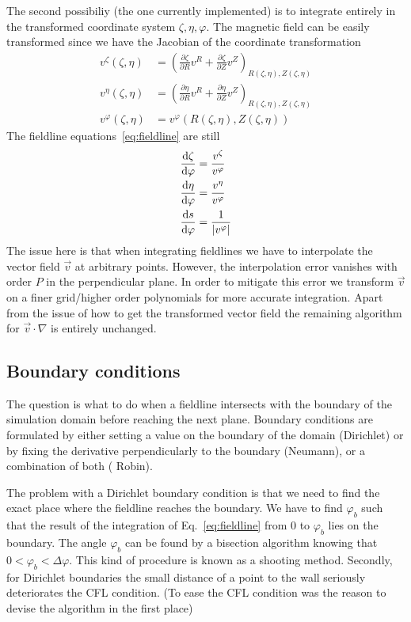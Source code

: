 The second possibiliy (the one currently implemented) 
is to integrate entirely in the 
transformed coordinate system $\zeta, \eta, \varphi$. 
The magnetic field can be easily transformed since we have the
Jacobian of the coordinate transformation
\begin{align}
    v^\zeta(\zeta, \eta) &= \left(\frac{\partial \zeta}{\partial R} v^{R} + \frac{\partial \zeta}{\partial Z}v^Z\right)_{R(\zeta, \eta), Z(\zeta, \eta)} \\
    v^\eta(\zeta, \eta) &= \left(\frac{\partial \eta}{\partial R} v^{R} + \frac{\partial \eta}{\partial Z}v^Z\right)_{R(\zeta, \eta), Z(\zeta, \eta)} \\
    v^\varphi(\zeta, \eta) &= v^\varphi({R(\zeta, \eta), Z(\zeta, \eta)})
    \label{eq:field_trafo}
\end{align}
The fieldline equations~\eqref{eq:fieldline} are still
\begin{subequations}
\begin{align}
\frac{\mathrm{d} \zeta}{\mathrm{d}\varphi} &= \frac{v^\zeta}{v^\varphi}\\
\frac{\mathrm{d} \eta}{\mathrm{d}\varphi} &= \frac{v^\eta}{v^\varphi}\\
\frac{\mathrm{d} s}{\mathrm{d}\varphi} &= \frac{1}{|v^\varphi|}
\end{align}
\label{eq:fieldlines}
\end{subequations}
The issue here is that when integrating fieldlines we
have to interpolate the vector field $\vec v$ at arbitrary points. 
However, the interpolation error vanishes with order $P$ in the 
perpendicular plane. In order to mitigate this error
we transform $\vec v$ on a finer grid/higher order polynomials for more accurate
integration.
Apart from the issue of how to get the transformed vector field 
the remaining algorithm for $\vec v\cdot\nabla$ is entirely unchanged.

\subsection{Boundary conditions}
The question is what to do when a fieldline intersects with the boundary
of the simulation domain before reaching the next plane.
Boundary conditions are formulated by either setting a value 
on the boundary of the domain (Dirichlet) or by fixing 
the derivative perpendicularly to the boundary (Neumann), or 
a combination of both ( Robin). 

The problem with a Dirichlet boundary condition 
is that we need to find the exact place where the fieldline 
reaches the boundary. 
We have to find
$\varphi_b$ such that the result of the integration of Eq.~\eqref{eq:fieldline} from 
$0$ to $\varphi_b$ lies on the boundary. 
The angle $\varphi_b$ can be found by a bisection algorithm knowing that $0<\varphi_b < \Delta\varphi$. 
This kind of procedure is known as a shooting method. 
Secondly, for Dirichlet boundaries the small 
distance of a point to the wall seriously deteriorates the CFL condition. (To ease the CFL condition 
was the reason to devise the algorithm in the first place)

